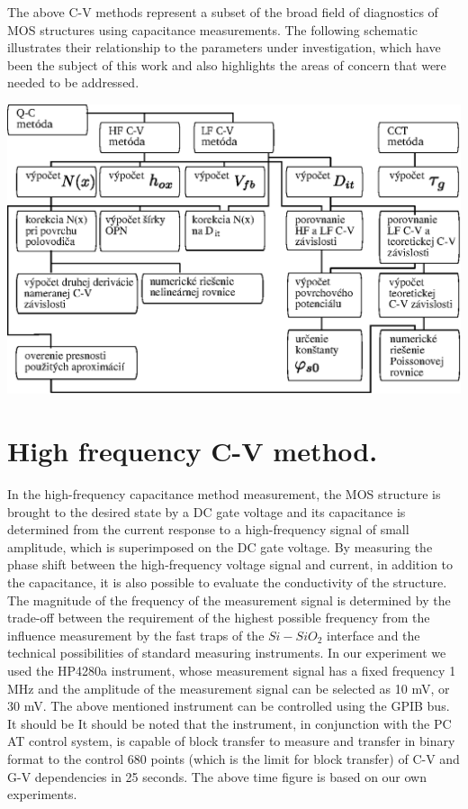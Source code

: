 The above C-V methods represent a subset of the broad field of
diagnostics of MOS structures using capacitance measurements. The
following schematic illustrates their relationship to the parameters
under investigation, which have been the subject of this work and also
highlights the areas of concern that were needed to be addressed.

\begin{diagram}
  \centering
  \includegraphics[width=\textwidth,height=\textheight,scale=0.7,keepaspectratio]{Figures/diagram-1.EPS}\label{diagram:1}
\end{diagram}

\section{High frequency C-V method.}\label{sec:3.1}

In the high-frequency capacitance method measurement, the MOS structure
is brought to the desired state by a DC gate voltage and its
capacitance is determined from the current response to a
high-frequency signal of small amplitude, which is superimposed on the
DC gate voltage. By measuring the phase shift between the
high-frequency voltage signal and current, in addition to the
capacitance, it is also possible to evaluate the conductivity of the
structure. The magnitude of the frequency of the measurement signal is
determined by the trade-off between the requirement of the highest
possible frequency from the influence measurement by the fast traps of
the $Si-SiO_2$ interface and the technical possibilities of standard
measuring instruments.  In our experiment we used the HP4280a
instrument, whose measurement signal has a fixed frequency 1 MHz and
the amplitude of the measurement signal can be selected as 10 mV, or
30 mV.  The above mentioned instrument can be controlled using the
GPIB bus. It should be It should be noted that the instrument, in
conjunction with the PC AT control system, is capable of block
transfer to measure and transfer in binary format to the control 680
points (which is the limit for block transfer) of C-V and G-V
dependencies in 25 seconds.  The above time figure is based on our own
experiments.

